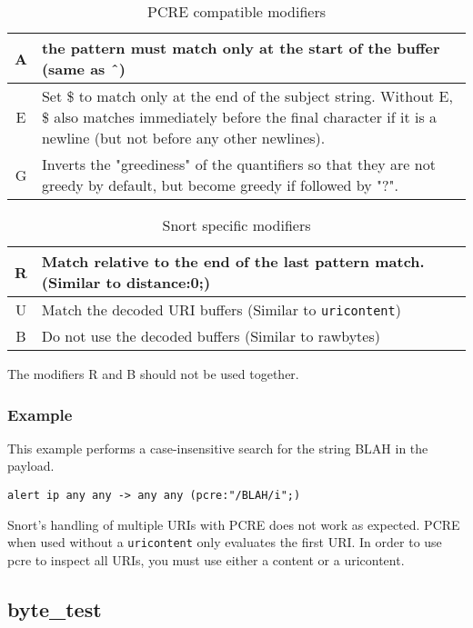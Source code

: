 \documentclass[english]{report}
\newenvironment{note}{
\samepage
    \vspace{10pt}{\textsf{
        {\hspace{7pt}\Huge{$\triangle$\hspace{-12.5pt}{\Large{$^!$}}}}\hspace{5pt}
        {\Large{NOTE}}
    }
    }
   \begin{center}
    \par\vspace{-17pt}

    \begin{lrbox}{\savepar}
    \begin{minipage}[r]{6in}
}
{
    \end{minipage}
    \end{lrbox}
    \fbox{
        \usebox{
            \savepar
	}
    }
    \par\vskip10pt
    \end{center}
}
\newenvironment{note}{
        \begin{rawhtml}
        <p><table border="1"><tr><td><b>
        Note:&nbsp;&nbsp;</b>
        \end{rawhtml}
}{
        \begin{rawhtml}
        </b></td></tr></table></p>
        \end{rawhtml}
}
\begin{document}
\begin{longtable}{|c|p{3.5in}|}
\caption{PCRE compatible modifiers} \\
\hline
A & the pattern must match only at the start of the buffer (same as \^\ ) \\
\hline
E & Set \$ to match only at the end of the subject string.  Without E, \$ also matches immediately before the final character if it is a newline (but not before any other newlines). \\
\hline
G & Inverts the "greediness" of the quantifiers so that they are not greedy by default, but become greedy if followed by "?". \\
\hline
\end{longtable}

\begin{longtable}{|c|p{3.5in}|}
\caption{Snort specific modifiers} \\
\hline
R & Match relative to the end of the last pattern match.  (Similar to distance:0;) \\
\hline
U & Match the decoded URI buffers (Similar to \texttt{uricontent}) \\
\hline
B & Do not use the decoded buffers (Similar to rawbytes) \\
\hline
\end{longtable}

The modifiers R and B should not be used together.

\subsubsection{Example}

This example performs a case-insensitive search for the string BLAH in the payload.

\begin{verbatim}
alert ip any any -> any any (pcre:"/BLAH/i";)
\end{verbatim}

\begin{note}
Snort's handling of multiple URIs with PCRE does not work as expected.  PCRE when used without a \texttt{uricontent} only evaluates the first URI.  In order to use pcre to inspect all URIs, you must use either a content or a uricontent.
\end{note}

\subsection{byte\_test\label{sub:byte_test}}
\end{document}
